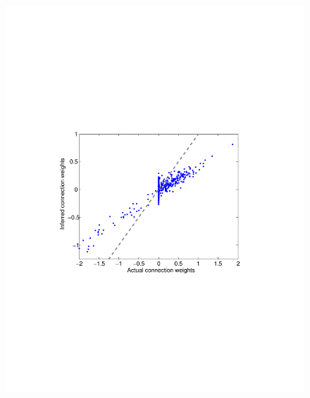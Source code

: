 \begin{figure}[h]
\begin{minipage}[c]{0.45\hsize}
\includegraphics[width=\hsize]{../figs/FigureA8_weak_corr}
\end{minipage}
\begin{minipage}[c]{0.45\hsize}

\end{minipage}
\end{figure}

